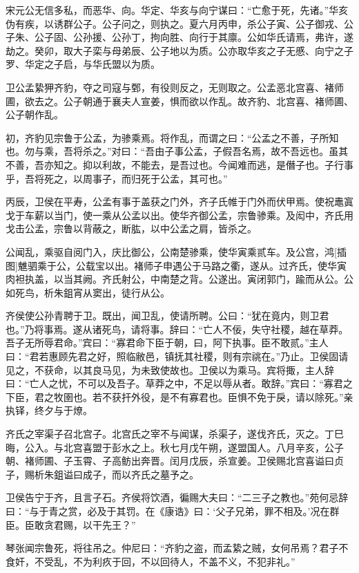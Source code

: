 \documentclass[a4paper,12pt,UTF8,twoside]{ctexbook}
\begin{document}
宋元公无信多私，而恶华、向。华定、华亥与向宁谋曰：“亡愈于死，先诸。”华亥伪有疾，以诱群公子。公子问之，则执之。夏六月丙申，杀公子寅、公子御戎、公子朱、公子固、公孙援、公孙丁，拘向胜、向行于其廪。公如华氏请焉，弗许，遂劫之。癸卯，取大子栾与母弟辰、公子地以为质。公亦取华亥之子无慼、向宁之子罗、华定之子启，与华氏盟以为质。

卫公孟絷狎齐豹，夺之司寇与鄄，有役则反之，无则取之。公孟恶北宫喜、褚师圃，欲去之。公子朝通于襄夫人宣姜，惧而欲以作乱。故齐豹、北宫喜、褚师圃、公子朝作乱。

初，齐豹见宗鲁于公孟，为骖乘焉。将作乱，而谓之曰：“公孟之不善，子所知也。勿与乘，吾将杀之。”对曰：“吾由子事公孟，子假吾名焉，故不吾远也。虽其不善，吾亦知之。抑以利故，不能去，是吾过也。今闻难而逃，是僭子也。子行事乎，吾将死之，以周事子，而归死于公孟，其可也。”

丙辰，卫侯在平寿，公孟有事于盖获之门外，齐子氏帷于门外而伏甲焉。使祝鼃寘戈于车薪以当门，使一乘从公孟以出。使华齐御公孟，宗鲁骖乘。及闳中，齐氏用戈击公孟，宗鲁以背蔽之，断肱，以中公孟之肩，皆杀之。

公闻乱，乘驱自阅门入，庆比御公，公南楚骖乘，使华寅乘贰车。及公宫，鸿[插图]魋驷乘于公，公载宝以出。褚师子申遇公于马路之衢，遂从。过齐氏，使华寅肉袒执盖，以当其阙。齐氏射公，中南楚之背。公遂出。寅闭郭门，踰而从公。公如死鸟，析朱鉏宵从窦出，徒行从公。

齐侯使公孙青聘于卫。既出，闻卫乱，使请所聘。公曰：“犹在竟内，则卫君也。”乃将事焉。遂从诸死鸟，请将事。辞曰：“亡人不佞，失守社稷，越在草莽。吾子无所辱君命。”宾曰：“寡君命下臣于朝，曰，阿下执事。臣不敢贰。”主人曰：“君若惠顾先君之好，照临敝邑，镇抚其社稷，则有宗祧在。”乃止。卫侯固请见之，不获命，以其良马见，为未致使故也。卫侯以为乘马。宾将掫，主人辞曰：“亡人之忧，不可以及吾子。草莽之中，不足以辱从者。敢辞。”宾曰：“寡君之下臣，君之牧圉也。若不获扞外役，是不有寡君也。臣惧不免于戾，请以除死。”亲执铎，终夕与于燎。

齐氏之宰渠子召北宫子。北宫氏之宰不与闻谋，杀渠子，遂伐齐氏，灭之。丁巳晦，公入。与北宫喜盟于彭水之上。秋七月戊午朔，遂盟国人。八月辛亥，公子朝、褚师圃、子玉霄、子高鲂出奔晋。闰月戊辰，杀宣姜。卫侯赐北宫喜谥曰贞子，赐析朱鉏谥曰成子，而以齐氏之墓予之。

卫侯告宁于齐，且言子石。齐侯将饮酒，徧赐大夫曰：“二三子之教也。”苑何忌辞曰：“与于青之赏，必及于其罚。在《康诰》曰：‘父子兄弟，罪不相及。’况在群臣。臣敢贪君赐，以干先王？”

琴张闻宗鲁死，将往吊之。仲尼曰：“齐豹之盗，而孟絷之贼，女何吊焉？君子不食奸，不受乱，不为利疚于回，不以回待人，不盖不义，不犯非礼。”
\end{document}
